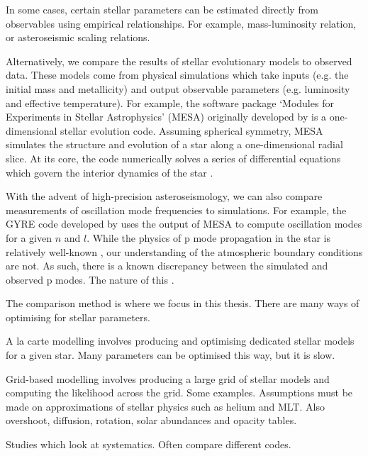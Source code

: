 In some cases, certain stellar parameters can be estimated directly from observables using empirical relationships. For example, mass-luminosity relation, or asteroseismic scaling relations.

Alternatively, we compare the results of stellar evolutionary models to observed data. These models come from physical simulations which take inputs (e.g. the initial mass and metallicity) and output observable parameters (e.g. luminosity and effective temperature). For example, the software package `Modules for Experiments in Stellar Astrophysics' (MESA) originally developed by \citet{Paxton.Bildsten.ea2011} is a one-dimensional stellar evolution code. Assuming spherical symmetry, MESA simulates the structure and evolution of a star along a one-dimensional radial slice. At its core, the code numerically solves a series of differential equations which govern the interior dynamics of the star \citep[see e.g.][]{Kippenhahn.Weigert.ea2013}.

With the advent of high-precision asteroseismology, we can also compare measurements of oscillation mode frequencies to simulations. For example, the GYRE code developed by \citet{Townsend.Teitler2013} uses the output of MESA to compute oscillation modes for a given \(n\) and \(l\). While the physics of p mode propagation in the star is relatively well-known \citep[see e.g.][]{Aerts.Christensen-Dalsgaard.ea2010}, our understanding of the atmospheric boundary conditions are not. As such, there is a known discrepancy between the simulated and observed p modes. The nature of this \citep{Ball.Gizon2014}.

The comparison method is where we focus in this thesis. There are many ways of optimising for stellar parameters.


A la carte modelling involves producing and optimising dedicated stellar models for a given star. Many parameters can be optimised this way, but it is slow.

Grid-based modelling involves producing a large grid of stellar models and computing the likelihood across the grid. Some examples. Assumptions must be made on approximations of stellar physics such as helium and MLT. Also overshoot, diffusion, rotation, solar abundances and opacity tables.

Studies which look at systematics. Often compare different codes.

